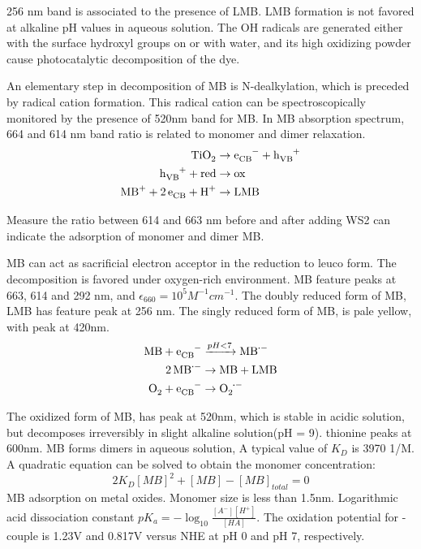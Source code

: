\documentclass[11pt]{article} %
\begin{document}
256 nm band is associated to the presence of LMB. LMB formation is not favored at alkaline pH values in aqueous solution. The OH radicals are generated either with the surface hydroxyl groups on  or with water, and its high oxidizing powder cause photocatalytic decomposition of the dye.

An elementary step in decomposition of MB is N-dealkylation, which is preceded by radical cation formation.\cite{Takizawa1978} This radical cation can be spectroscopically monitored by the presence of 520nm band for MB. In MB absorption spectrum, 664 and 614 nm band ratio is related to monomer and dimer relaxation.
\begin{align}
\cee{TiO2 &\rightarrow e_{CB}^- + h_{VB}^+ \\
h_{VB}^+ + red &\rightarrow ox\\
MB^+ + 2e_{CB}^ + H^+ &\rightarrow LMB}
\end{align}

Measure the ratio between 614 and 663 nm before and after adding WS2 can indicate the adsorption of monomer and dimer MB.


\cite{Mills1999} MB can act as sacrificial electron acceptor in the reduction to leuco form. The decomposition is favored under oxygen-rich environment. MB feature peaks at 663, 614 and 292 nm, and $\epsilon_{660}=10^5 M^{-1}cm^{-1}$. The doubly reduced form of MB, LMB has feature peak at 256 nm. The singly reduced form of MB,  is pale yellow, with peak at 420nm.
\begin{align}
\cee{MB + e_{CB}^- &->[pH<7] MB^{.-} \\
2MB^{.-} &\rightarrow MB + LMB\\
O2 + e_{CB}^- &\rightarrow O2^{.-}}
\end{align}

The oxidized form of MB,  has peak at 520nm, which is stable in acidic solution, but decomposes irreversibly in slight alkaline solution(pH = 9).
thionine peaks at 600nm.
MB forms dimers in aqueous solution,
A typical value of $K_D$ is 3970 1/M. A quadratic equation can be solved to obtain the monomer concentration:
\[
2K_D [MB]^2 + [MB] - [MB]_{total} = 0
\]
MB adsorption on metal oxides. Monomer size is less than 1.5nm.
Logarithmic acid dissociation constant $pK_a= -\log_10 \frac{[A^-][H^+]}{[HA]}$. The oxidation potential for - couple is 1.23V and 0.817V versus NHE at pH 0 and pH 7, respectively.


\end{document}
